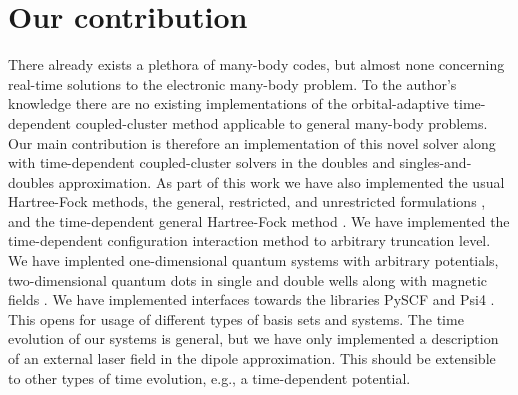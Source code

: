     \section{Our contribution}
        There already exists a plethora of many-body codes, but almost none
        concerning real-time solutions to the electronic many-body problem.
        To the author's knowledge there are no existing implementations of the
        orbital-adaptive time-dependent coupled-cluster method applicable to
        general many-body problems.
        Our main contribution is therefore an implementation of this novel
        solver along with time-dependent coupled-cluster solvers in the doubles
        and singles-and-doubles approximation.
        As part of this work we have also implemented the usual Hartree-Fock
        methods, the general, restricted, and unrestricted formulations
        \cite{szabo1996modern}, and the time-dependent general Hartree-Fock
        method \cite{hochstuhl2014time}.
        We have implemented the time-dependent configuration interaction method
        to arbitrary truncation level.
        We have implented one-dimensional quantum systems with arbitrary
        potentials, two-dimensional quantum dots in single and double wells
        along with magnetic fields \cite{greg-winther}.
        We have implemented interfaces towards the libraries PySCF \cite{pyscf}
        and Psi4 \cite{psi4}.
        This opens for usage of different types of basis sets and systems.
        The time evolution of our systems is general, but we have only
        implemented a description of an external laser field in the dipole
        approximation.
        This should be extensible to other types of time evolution, e.g., a
        time-dependent potential.

